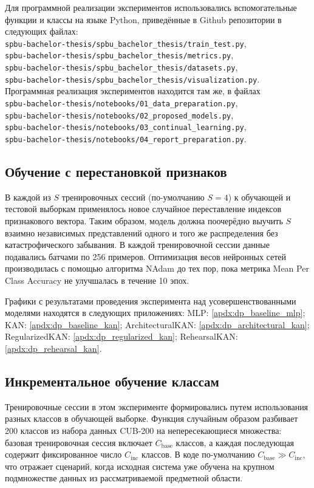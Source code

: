 \documentclass[a4paper,14pt]{extarticle}
\begin{document}
Для программной реализации экспериментов использовались вспомогательные функции
и классы на языке Python, приведённые в Github репозитории
\cite{spbubachelorthesis} в следующих файлах:\\
\texttt{spbu-bachelor-thesis/spbu\_bachelor\_thesis/train\_test.py},\\
\texttt{spbu-bachelor-thesis/spbu\_bachelor\_thesis/metrics.py},\\
\texttt{spbu-bachelor-thesis/spbu\_bachelor\_thesis/datasets.py},\\
\texttt{spbu-bachelor-thesis/spbu\_bachelor\_thesis/visualization.py}.\\
Программная реализация экспериментов находится там же, в файлах\\
\texttt{spbu-bachelor-thesis/notebooks/01\_data\_preparation.py},\\
\texttt{spbu-bachelor-thesis/notebooks/02\_proposed\_models.py},\\
\texttt{spbu-bachelor-thesis/notebooks/03\_continual\_learning.py},\\
\texttt{spbu-bachelor-thesis/notebooks/04\_report\_preparation.py}.
\subsection{Обучение с перестановкой признаков}
В каждой из \(S\) тренировочных сессий (по-умолчанию \(S=4\)) к обучающей и
тестовой выборкам применялось новое случайное переставление индексов
признакового вектора. Таким образом, модель должна поочерёдно выучить \(S\)
взаимно независимых представлений одного и того же распределения без
катастрофического забывания. В каждой тренировочной сессии данные подавались
батчами по 256 примеров. Оптимизация весов нейронных сетей производилась с
помощью алгоритма NAdam до тех пор, пока метрика Mean Per Class Accuracy не
улучшалась в течение 10 эпох.

Графики с результатами проведения эксперимента над усовершенствованными моделями
находятся в следующих приложениях: MLP: \ref{apdx:dp_baseline_mlp}; KAN: \ref{apdx:dp_baseline_kan};
ArchitecturalKAN: \ref{apdx:dp_architectural_kan}; RegularizedKAN: \ref{apdx:dp_regularized_kan};
RehearsalKAN: \ref{apdx:dp_rehearsal_kan}.
\subsection{Инкрементальное обучение классам}
Тренировочные сессии в этом эксперименте формировались путем использования
разных классов в обучающей выборке. Функция случайным образом разбивает 200
классов из набора данных CUB-200 на непересекающиеся множества: базовая
тренировочная сессия включает \(C_{\text{base}}\) классов, а каждая последующая
содержит фиксированное число \(C_{\text{inc}}\) классов. В коде по-умолчанию
\(C_{\text{base}}\gg C_{\text{inc}}\), что отражает сценарий, когда исходная
система уже обучена на крупном подмножестве данных из рассматриваемой
предметной области.
\end{document}
